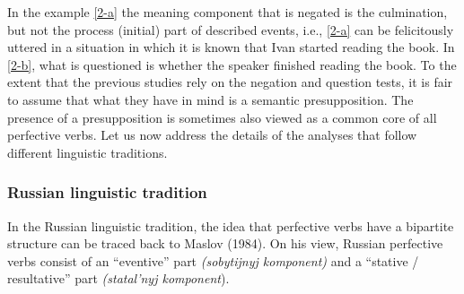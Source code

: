 In the example \ref{2-a} the meaning component that is negated is the culmination, but not the process (initial) part of described events, i.e., \ref{2-a} can be felicitously uttered in a situation in which it is known that Ivan started reading the book. In \ref{2-b}, what is questioned is whether the speaker finished reading the book. To the extent that the previous studies rely on the negation and question tests, it is fair to assume that what they have in mind is a semantic presupposition. The presence of a presupposition is sometimes \citep[e.g., by][]{Paducheva:96, Romanova:04} also viewed as a common core of all perfective verbs. Let us now address the details of the analyses that follow different linguistic traditions.


\subsubsection{Russian linguistic tradition}
In the Russian linguistic tradition, the idea that perfective verbs have a bipartite structure can be traced back to Maslov (1984). On his view, Russian perfective verbs consist of an ``eventive'' part \textit{(sobytijnyj komponent)} and a ``stative / resultative'' part \textit{(statal'nyj komponent}).

